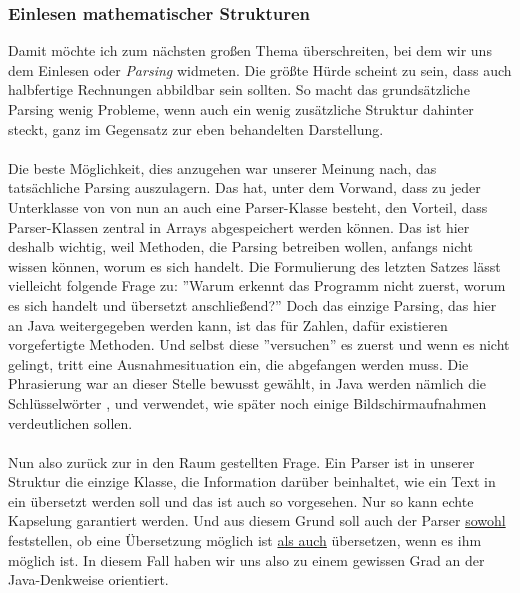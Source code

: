 \subsubsection{Einlesen mathematischer Strukturen}
Damit möchte ich zum nächsten großen Thema überschreiten, bei dem wir uns dem Einlesen oder \textit{Parsing} widmeten. Die größte Hürde scheint zu sein, dass auch halbfertige Rechnungen abbildbar sein sollten. So macht das grundsätzliche Parsing wenig Probleme, wenn auch ein wenig zusätzliche Struktur dahinter steckt, ganz im Gegensatz zur eben behandelten Darstellung.\\
\\
Die beste Möglichkeit, dies anzugehen war unserer Meinung nach, das tatsächliche Parsing auszulagern. Das hat, unter dem Vorwand, dass zu jeder Unterklasse von  von nun an auch eine Parser-Klasse besteht, den Vorteil, dass Parser-Klassen zentral in Arrays abgespeichert werden können. Das ist hier deshalb wichtig, weil Methoden, die Parsing betreiben wollen, anfangs nicht wissen können, worum es sich handelt. Die Formulierung des letzten Satzes lässt vielleicht folgende Frage zu: ''Warum erkennt das Programm nicht zuerst, worum es sich handelt und übersetzt anschließend?'' Doch das einzige Parsing, das hier an Java weitergegeben werden kann, ist das für Zahlen, dafür existieren vorgefertigte Methoden. Und selbst diese ''versuchen'' es zuerst und wenn es nicht gelingt, tritt eine Ausnahmesituation ein, die abgefangen werden muss. Die Phrasierung war an dieser Stelle bewusst gewählt, in Java werden nämlich die Schlüsselwörter ,  und  verwendet, wie später noch einige Bildschirmaufnahmen verdeutlichen sollen.\\
\\
Nun also zurück zur in den Raum gestellten Frage. Ein Parser ist in unserer Struktur die einzige Klasse, die Information darüber beinhaltet, wie ein Text in ein  übersetzt werden soll und das ist auch so vorgesehen. Nur so kann echte Kapselung garantiert werden. Und aus diesem Grund soll auch der Parser \underline{sowohl} feststellen, ob eine Übersetzung möglich ist \underline{als auch} übersetzen, wenn es ihm möglich ist. In diesem Fall haben wir uns also zu einem gewissen Grad an der Java-Denkweise orientiert.\\
\\
